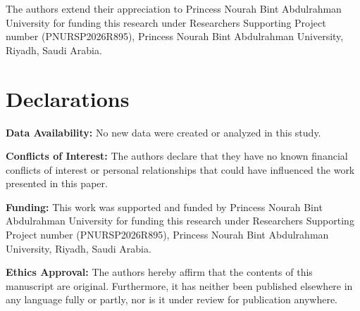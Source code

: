 \documentclass[a4paper,11pt]{article}
\theoremstyle{plain}
\numberwithin{equation}{section}
\begin{document}
The authors extend their appreciation to Princess Nourah Bint Abdulrahman University for funding this research under Researchers Supporting Project number (PNURSP2026R895), Princess Nourah Bint Abdulrahman University, Riyadh, Saudi Arabia.

\section*{Declarations}

\textbf{Data Availability:} No new data were created or analyzed in this study.

\textbf{Conflicts of Interest:} The authors declare that they have no known financial conflicts of interest or personal relationships that could have influenced the work presented in this paper.

\textbf{Funding:} This work was supported and funded by Princess Nourah Bint Abdulrahman University for funding this research under Researchers Supporting Project number (PNURSP2026R895), Princess Nourah Bint Abdulrahman University, Riyadh, Saudi Arabia.

\textbf{Ethics Approval:} The authors hereby affirm that the contents of this manuscript are original. Furthermore, it has neither been published elsewhere in any language fully or partly, nor is it under review for publication anywhere.
\end{document}
